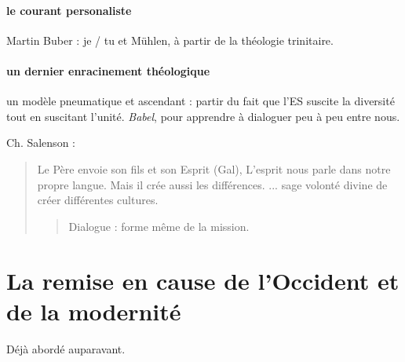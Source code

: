    \paragraph{le courant personaliste}
   Martin Buber : je / tu  et Mühlen, à partir de la théologie trinitaire.
   
   \paragraph{un dernier enracinement théologique} un modèle pneumatique et ascendant : partir du fait que l'ES suscite la diversité tout en suscitant l'unité. \emph{Babel}, pour apprendre à dialoguer peu à peu entre nous. 
   
   Ch. Salenson : 
   \begin{quote}
       Le Père envoie son fils et son Esprit (Gal), L'esprit nous parle dans notre propre langue. Mais il crée aussi les différences. ... sage volonté divine de créer différentes cultures. 
       \begin{quote}
           Dialogue : forme même de la mission. 
       \end{quote}
   \end{quote}
   
   \section{La remise en cause de l’Occident et de la modernité }
  Déjà abordé auparavant.
  
   